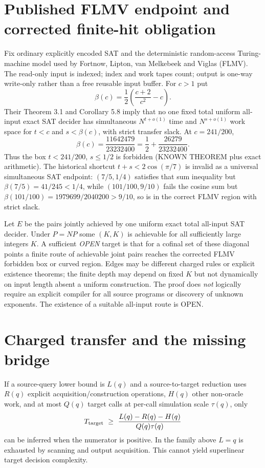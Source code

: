 \documentclass[11pt]{article}
\begin{document}
\section{Published FLMV endpoint and corrected finite-hit obligation}
Fix ordinary explicitly encoded SAT and the deterministic random-access Turing-machine model used by Fortnow, Lipton, van Melkebeek and Viglas (FLMV). The read-only input is indexed; index and work tapes count; output is one-way write-only rather than a free reusable input buffer. For $c>1$ put
\[
\beta(c)=\frac12\left(\frac{c+2}{c^2}-c\right).
\]
Their Theorem 3.1 and Corollary 5.8 imply that no one fixed total uniform all-input exact SAT decider has simultaneous $N^{t+o(1)}$ time and $N^{s+o(1)}$ work space for $t<c$ and $s<\beta(c)$, with strict transfer slack. At $c=241/200$,
\[
\beta(c)=\frac{11642479}{23232400}
=\frac12+\frac{26279}{23232400}.
\]
Thus the box $t<241/200$, $s\le1/2$ is forbidden (KNOWN THEOREM plus exact arithmetic).
The historical shortcut $t+s<2\cos(\pi/7)$ is invalid as a universal simultaneous SAT endpoint: $(7/5,1/4)$ satisfies that sum inequality but $\beta(7/5)=41/245<1/4$, while $(101/100,9/10)$ fails the cosine sum but $\beta(101/100)=1979699/2040200>9/10$, so is in the correct FLMV region with strict slack.

Let $E$ be the pairs jointly achieved by one uniform exact total all-input SAT decider. Under $P=NP$ some $(K,K)$ is achievable for all sufficiently large integers $K$. A sufficient \emph{OPEN} target is that for a cofinal set of these diagonal points a finite route of achievable joint pairs reaches the corrected FLMV forbidden box or curved region. Edges may be different charged rules or explicit existence theorems; the finite depth may depend on fixed $K$ but not dynamically on input length absent a uniform construction. The proof does \emph{not} logically require an explicit compiler for all source programs or discovery of unknown exponents. The existence of a suitable all-input route is OPEN.

\section{Charged transfer and the missing bridge}
If a source-query lower bound is $L(q)$ and a source-to-target reduction uses $R(q)$ explicit acquisition/construction operations, $H(q)$ other non-oracle work, and at most $Q(q)$ target calls at per-call simulation scale $\tau(q)$, only
\[
T_{\rm target}\ \ge\ \frac{L(q)-R(q)-H(q)}{Q(q)\tau(q)}
\]
can be inferred when the numerator is positive. In the family above $L=q$ is exhausted by scanning and output acquisition. This cannot yield superlinear target decision complexity.
\end{document}

